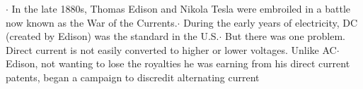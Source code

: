 \documentclass[preview]{standalone}
\begin{document}
\centering $\cdot$ In the late 1880s, Thomas Edison and Nikola Tesla were embroiled in a battle now known as the War of the Currents.\newline $\cdot$ During the early years of electricity, DC (created by Edison) was the standard in the U.S.\newline $\cdot$ But there was one problem. Direct current is not easily converted to higher or lower voltages. Unlike AC\newline $\cdot$ Edison, not wanting to lose the royalties he was earning from his direct current patents, began a campaign to discredit alternating current
\end{document}
